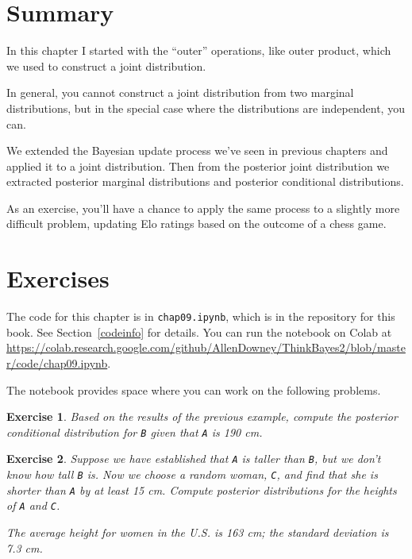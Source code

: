 \documentclass[12pt]{book}
\theoremstyle{exercise}
\newtheorem{exercise}{Exercise}[chapter]
\newcommand{\py}[1]{{\tt #1}}%
\begin{document}
\section{Summary}

In this chapter I started with the ``outer'' operations, like outer product, which we used to construct a joint distribution.

In general, you cannot construct a joint distribution from two marginal distributions, but in the special case where the distributions are independent, you can.

We extended the Bayesian update process we've seen in previous chapters and applied it to a joint distribution.  Then from the posterior joint distribution we extracted posterior marginal distributions and posterior conditional distributions.

As an exercise, you'll have a chance to apply the same process to a slightly more difficult problem, updating Elo ratings based on the outcome of a chess game.


\section{Exercises}

The code for this chapter is in \py{chap09.ipynb}, which is in the repository for this book.  See Section~\ref{codeinfo} for details.
You can run the notebook on Colab at \url{https://colab.research.google.com/github/AllenDowney/ThinkBayes2/blob/master/code/chap09.ipynb}.

The notebook provides space where you can work on the following problems.

\begin{exercise}
Based on the results of the previous example, compute the posterior conditional distribution for \py{B} given that \py{A} is 190 cm.
\end{exercise}


\begin{exercise}
Suppose we have established that \py{A} is taller than \py{B}, but we don't know how tall \py{B} is.
Now we choose a random woman, \py{C}, and find that she is shorter than \py{A} by at least 15 cm.  Compute posterior distributions for the heights of \py{A} and \py{C}.

The average height for women in the U.S. is 163 cm; the standard deviation is 7.3 cm.
\end{exercise}
\end{document}
